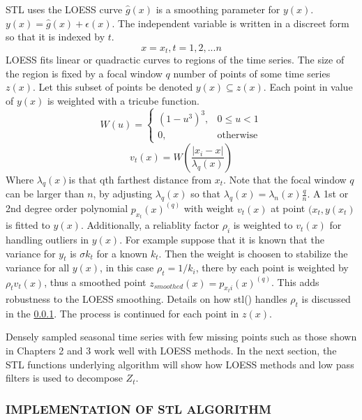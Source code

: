 STL uses the LOESS curve $\hat{g}(x)$ is a smoothing parameter for $y(x)$. $y(x)=\hat{g}(x) + \epsilon(x)$. The independent variable is written in a discreet form so that it is indexed by $t$. 
\begin{equation}
x = x_t, t = 1, 2, ... n
\end{equation}
LOESS fits linear or quadractic curves to regions of the time series. The size of the region is fixed by a focal window $q$ number of points of some time series $z(x)$. Let this subset of points be denoted $y(x) \subseteq z(x)$. Each point in value of $y(x)$ is weighted with a tricube function.
\begin{equation}\label{eq:tricube}
  W(u)=\begin{cases}
    (1-u^3)^3, & 0 \leq u < 1\\
    0, & \text{otherwise}
  \end{cases}
\end{equation}
\begin{equation}\label{eq:u}
v_t(x) = W \left( \frac{|x_i - x|}{\lambda_q(x)} \right)
\end{equation}
Where $\lambda_q(x)$is that qth farthest distance from $x_t$. Note that the focal window $q$ can be larger than $n$, by adjusting  $\lambda_q(x)$ so that $\lambda_q(x) = \lambda_n(x)\frac{q}{n}$.
A 1st or 2nd degree order polynomial $p_{x_t}(x)^{(q)}$ with weight $v_t(x)$ at point $(x_t, y(x_t)$ is fitted to $y(x)$. Additionally, a reliablity factor $\rho_i$ is weighted to $v_t(x)$ for handling outliers in $y(x)$. For example suppose that it is known that the variance for $y_t$ is $\sigma k_t$ for a known $k_t$. Then the weight is choosen to stabilize the variance for all $y(x)$, in this case $\rho_t = 1/k_i$, there by each point is weighted by $\rho_t v_t(x)$, thus a smoothed point $z_{smoothed}(x) = p_{x_ti}(x)^{(q)}$. This adds robustness to the LOESS smoothing. Details on how stl() handles $\rho_t$ is discussed in the \ref{sec:stl}. The process is continued for each point in $z(x)$.

Densely sampled seasonal time series with few missing points such as those shown in Chapters 2 and 3 work well with LOESS methods. In the next section, the STL functions underlying algorithm will show how LOESS methods and low pass filters is used to decompose $Z_t$.

\subsubsection{IMPLEMENTATION OF STL ALGORITHM}\label{sec:stl}

